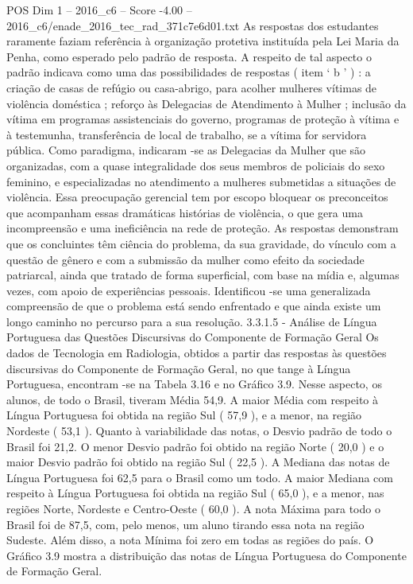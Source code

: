 \begin{textsample}{POS Dim 1 – 2016\_c6 – Score -4.00 – 2016\_c6/enade\_2016\_tec\_rad\_371c7e6d01.txt}
As respostas dos estudantes raramente faziam referência à organização protetiva instituída pela Lei Maria da Penha, como esperado pelo padrão de resposta.
A respeito de tal aspecto o padrão indicava como uma das possibilidades de respostas ( item ‘ b ’ ) : a criação de casas de refúgio ou casa-abrigo, para acolher mulheres vítimas de violência doméstica ; reforço às Delegacias de Atendimento à Mulher ; inclusão da vítima em programas assistenciais do governo, programas de proteção à vítima e à testemunha, transferência de local de trabalho, se a vítima for servidora pública.
Como paradigma, indicaram -se as Delegacias da Mulher que são organizadas, com a quase integralidade dos seus membros de policiais do sexo feminino, e especializadas no atendimento a mulheres submetidas a situações de violência.
Essa preocupação gerencial tem por escopo bloquear os preconceitos que acompanham essas dramáticas histórias de violência, o que gera uma incompreensão e uma ineficiência na rede de proteção.
As respostas demonstram que os concluintes têm ciência do problema, da sua gravidade, do vínculo com a questão de gênero e com a submissão da mulher como efeito da sociedade patriarcal, ainda que tratado de forma superficial, com base na mídia e, algumas vezes, com apoio de experiências pessoais.
Identificou -se uma generalizada compreensão de que o problema está sendo enfrentado e que ainda existe um longo caminho no percurso para a sua resolução. 3.3.1.5 - Análise de Língua Portuguesa das Questões Discursivas do Componente de Formação Geral Os dados de Tecnologia em Radiologia, obtidos a partir das respostas às questões discursivas do Componente de Formação Geral, no que tange à Língua Portuguesa, encontram -se na Tabela 3.16 e no Gráfico 3.9.
Nesse aspecto, os alunos, de todo o Brasil, tiveram Média 54,9.
A maior Média com respeito à Língua Portuguesa foi obtida na região Sul ( 57,9 ), e a menor, na região Nordeste ( 53,1 ).
Quanto à variabilidade das notas, o Desvio padrão de todo o Brasil foi 21,2.
O menor Desvio padrão foi obtido na região Norte ( 20,0 ) e o maior Desvio padrão foi obtido na região Sul ( 22,5 ).
A Mediana das notas de Língua Portuguesa foi 62,5 para o Brasil como um todo.
A maior Mediana com respeito à Língua Portuguesa foi obtida na região Sul ( 65,0 ), e a menor, nas regiões Norte, Nordeste e Centro-Oeste ( 60,0 ).
A nota Máxima para todo o Brasil foi de 87,5, com, pelo menos, um aluno tirando essa nota na região Sudeste.
Além disso, a nota Mínima foi zero em todas as regiões do país.
O Gráfico 3.9 mostra a distribuição das notas de Língua Portuguesa do Componente de Formação Geral.

\end{textsample}
